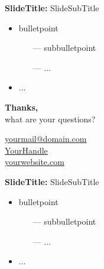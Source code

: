 \documentclass{beamer} %
\begin{document}
\begin{frame}{\textbf{SlideTitle:} SlideSubTitle}
	\begin{itemize}
	    \item bulletpoint
    	\begin{itemize}
    	    \item[---] subbulletpoint
    	    \item[---] ...
    	\end{itemize}
    	\item ...
	\end{itemize}
\end{frame}

{
    \begin{frame}[plain]
    	\vspace{1.5cm}
    	{\color{white}\huge \textbf{Thanks,}\\ \vspace{.4cm} \Large what are your questions?}
    		
    	\vspace{2.5cm}
    	
    	\hspace{7cm}\circled{{\color{ifo-blue}\fontsize{8}{9}\faEnvelope}} \hspace{.1cm} {\footnotesize \color{white} \href{mailto:yourmail@domain.com}{yourmail@domain.com}}\\ %
    	\hspace{7cm}\circled{{\color{ifo-blue}\footnotesize\faTwitter}} \hspace{.1cm} {\footnotesize \color{white} \href{#}{YourHandle}}\\ %
    	\hspace{7cm}\circled{{\color{ifo-blue}\footnotesize\faHome}} \hspace{.1cm} {\footnotesize \color{white} \href{#}{yourwebsite.com}}\\ %
    \end{frame}
    \addtocounter{framenumber}{-1}
}

\appendix
\backupbegin
\renewcommand{\theframenumber}{\Roman{framenumber}}

\begin{frame}{\textbf{SlideTitle:} SlideSubTitle}
	\begin{itemize}
	    \item bulletpoint
    	\begin{itemize}
    	    \item[---] subbulletpoint
    	    \item[---] ...
    	\end{itemize}
    	\item ...
	\end{itemize}
\end{frame}

\backupend
\end{document}
